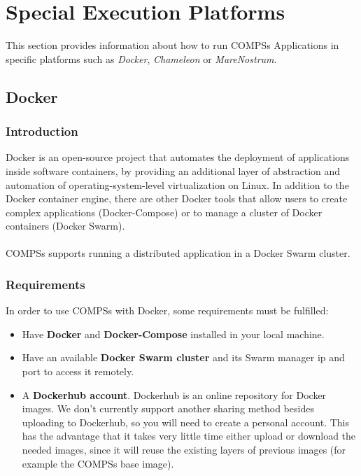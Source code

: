 \section{Special Execution Platforms}
\label{sec:Execution_Platfors}

This section provides information about how to run COMPSs Applications in specific platforms such as \textit{Docker},
\textit{Chameleon} or \textit{MareNostrum}.


\subsection{Docker}

\subsubsection{Introduction}
Docker is an open-source project that automates the deployment of applications inside software containers, 
by providing an additional layer of abstraction and automation of operating-system-level virtualization on Linux.
In addition to the Docker container engine, there are other Docker tools that allow users to create complex applications (Docker-Compose) 
or to manage a cluster of Docker containers (Docker Swarm).
\\ \\ 
COMPSs supports running a distributed application in a Docker Swarm cluster.
\\

\subsubsection{Requirements}
In order to use COMPSs with Docker, some requirements must be fulfilled:
\begin{itemize}  
\item Have \textbf{Docker} and \textbf{Docker-Compose} installed in your local machine.
\item Have an available \textbf{Docker Swarm cluster} and its Swarm manager ip and port to access it remotely.
\item A \textbf{Dockerhub account}. Dockerhub is an online repository for Docker images. We don't currently support
      another sharing method besides uploading to Dockerhub, so you will need to create a personal account.
      This has the advantage that it takes very little time either upload or download the needed images, since it 
      will reuse the existing layers of previous images (for example the COMPSs base image).
\end{itemize}

